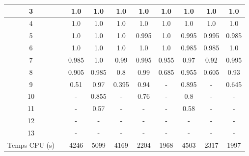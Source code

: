 \documentclass[french,nochapter,11pt]{rapportUB}
\begin{document}
\begin{table}[htbp]
\begin{tabular}{|c|c|c|c|c|c|c|c|c|c|}
    \hline
    3 &\phantom &1.0	&1.0	&1.0	&1.0	&1.0	&1.0	&1.0	&1.0 \\
    \hline
    4 &\phantom &1.0	&1.0	&1.0	&1.0	&1.0	&1.0	&1.0	&1.0 \\
    \hline
    5 &\phantom &1.0	&1.0	&1.0	&0.995	&1.0	&0.995	&0.995	 &0.985 \\
    \hline
    6 &\phantom &1.0	&1.0	&1.0	&1.0	&1.0	&0.985	&0.985	&1.0 \\
    \hline
    7 &\phantom &0.985	&1.0	&0.99	&0.995	&0.955	&0.97	&0.92	&0.995 \\
    \hline
    8 &\phantom &0.905	&0.985	&0.8	&0.99	&0.685	&0.955	&0.605	&0.93 \\
    \hline
    9 &\phantom &0.51	&0.97	&0.395	&0.94	&-	&0.895	&-	&0.645 \\
    \hline
    10 &\phantom &-	&0.855	&-	&0.76	&-	&0.8	&-	&- \\
    \hline
    11 &\phantom  &-	&0.57	&-	&-	&-	&0.58	&-	&- \\
    \hline
    12 &\phantom &-	&-	&-	&-	&-	&-	&-	&- \\
    \hline
    13 &\phantom &-	&-	&-	&-	&-	&-	&-	&- \\
    \hline
    Temps CPU (s) &\phantom &4246	&5099	&4169	&2204	&1968	&4503	&2317	&1997\\
    \hline
  \end{tabular}
\end{table}%
\clearpage
\end{document}
